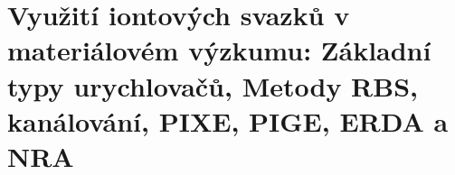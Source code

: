 \section[Využití iontových svazků v materiálovém výzkumu]{Využití iontových svazků v materiálovém výzkumu: Základní typy urychlovačů, Metody RBS, kanálování, PIXE, PIGE, ERDA a NRA}

